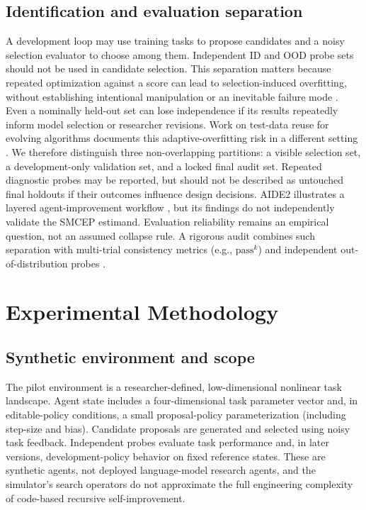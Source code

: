 \documentclass[11pt,a4paper]{article}
\begin{document}
\subsection{Identification and evaluation separation}
A development loop may use training tasks to propose candidates and a noisy selection evaluator to choose among them. Independent ID and OOD probe sets should not be used in candidate selection. This separation matters because repeated optimization against a score can lead to selection-induced overfitting, without establishing intentional manipulation or an inevitable failure mode \cite{goodhart1984}. Even a nominally held-out set can lose independence if its results repeatedly inform model selection or researcher revisions. Work on test-data reuse for evolving algorithms documents this adaptive-overfitting risk in a different setting \cite{gossmann2021}. We therefore distinguish three non-overlapping partitions: a visible selection set, a development-only validation set, and a locked final audit set. Repeated diagnostic probes may be reported, but should not be described as untouched final holdouts if their outcomes influence design decisions. AIDE2 illustrates a layered agent-improvement workflow \cite{srikanth2026}, but its findings do not independently validate the SMCEP estimand. Evaluation reliability remains an empirical question, not an assumed collapse rule. A rigorous audit combines such separation with multi-trial consistency metrics (e.g., $\mathrm{pass}^k$) and independent out-of-distribution probes \cite{mohammadi2025evaluation}.

\section{Experimental Methodology}
\subsection{Synthetic environment and scope}
The pilot environment is a researcher-defined, low-dimensional nonlinear task landscape. Agent state includes a four-dimensional task parameter vector and, in editable-policy conditions, a small proposal-policy parameterization (including step-size and bias). Candidate proposals are generated and selected using noisy task feedback. Independent probes evaluate task performance and, in later versions, development-policy behavior on fixed reference states. These are synthetic agents, not deployed language-model research agents, and the simulator's search operators do not approximate the full engineering complexity of code-based recursive self-improvement.
\end{document}
